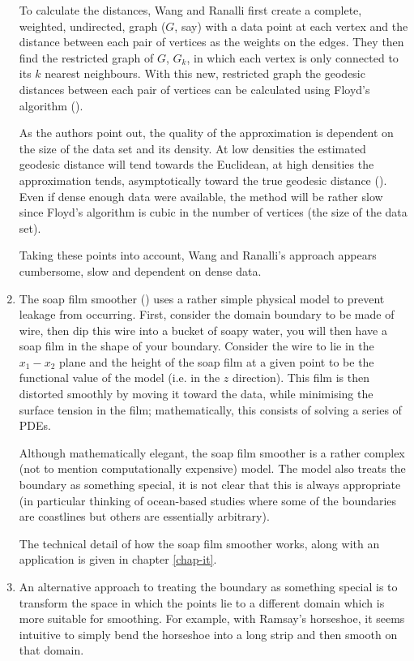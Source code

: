 \begin{enumerate}
To calculate the distances, Wang and Ranalli first create a complete, weighted, undirected, graph ($G$, say) with a data point at each vertex and the distance between each pair of vertices as the weights on the edges. They then find the restricted graph of $G$, $G_k$, in which each vertex is only connected to its $k$ nearest neighbours. With this new, restricted graph the geodesic distances between each pair of vertices can be calculated using Floyd's algorithm (\cite{Floyd}).

As the authors point out, the quality of the approximation is dependent on the size of the data set and its density. At low densities the estimated geodesic distance will tend towards the Euclidean, at high densities the approximation tends, asymptotically toward the true geodesic distance (\cite{bernstein}). Even if  dense enough data were available, the method will be rather slow since Floyd's algorithm is cubic in the number of vertices (the size of the data set). 

Taking these points into account, Wang and Ranalli's approach appears cumbersome, slow and dependent on dense data.

\item The soap film smoother (\cite{soap}) uses a rather simple physical model to prevent leakage from occurring. First, consider the domain boundary to be made of wire, then dip this wire into a bucket of soapy water, you will then have a soap film in the shape of your boundary. Consider the wire to lie in the $x_1-x_2$ plane and the height of the soap film at a given point to be the functional value of the model (i.e. in the $z$ direction). This film is then distorted smoothly by moving it toward the data, while minimising the surface tension in the film; mathematically, this consists of solving a series of PDEs. 

Although mathematically elegant, the soap film smoother is a rather complex (not to mention computationally expensive) model. The model also treats the boundary as something special, it is not clear that this is always appropriate (in particular thinking of ocean-based studies where some of the boundaries are coastlines but others are essentially arbitrary).

The technical detail of how the soap film smoother works, along with an application is given in chapter \ref{chap-it}. 


\item An alternative approach to treating the boundary as something special is to transform the space in which the points lie to a different domain which is more suitable for smoothing. For example, with Ramsay's horseshoe, it seems intuitive to simply bend the horseshoe into a long strip and then smooth on that domain.


\end{enumerate}
